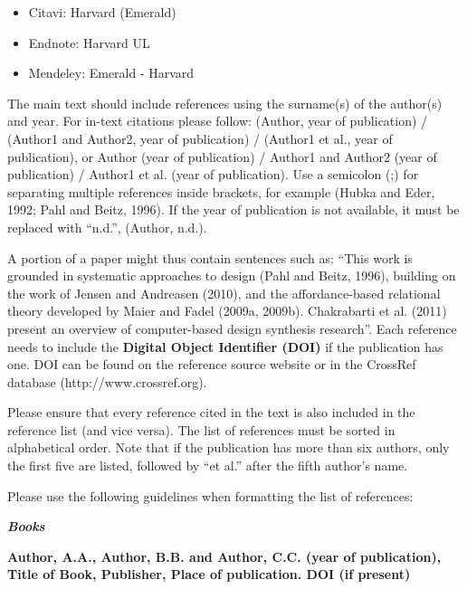 \documentclass{design}
\begin{document}
\begin{itemize}
    \item Citavi: Harvard (Emerald)
    \item Endnote: Harvard UL
    \item Mendeley: Emerald - Harvard
\end{itemize}

The main text should include references using the surname(s) of the author(s) and year. For in-text citations please follow: (Author, year of publication) / (Author1 and Author2, year of publication) / (Author1 et al., year of publication), or Author (year of publication) / Author1 and Author2 (year of publication) / Author1 et al. (year of publication). Use a semicolon (;) for separating multiple references inside brackets, for example (Hubka and Eder, 1992; Pahl and Beitz, 1996). If the year of publication is not available, it must be replaced with “n.d.”, (Author, n.d.).

A portion of a paper might thus contain sentences such as: “This work is grounded in systematic approaches to design (Pahl and Beitz, 1996), building on the work of Jensen and Andreasen (2010), and the affordance-based relational theory developed by Maier and Fadel (2009a, 2009b). Chakrabarti et al. (2011) present an overview of computer-based design synthesis research”.
Each reference needs to include the \textbf{Digital Object Identifier (DOI)} if the publication has one. DOI can be found on the reference source website or in the CrossRef database (http://www.crossref.org). 

Please ensure that every reference cited in the text is also included in the reference list (and vice versa). The list of references must be sorted in alphabetical order. Note that if the publication has more than six authors, only the first five are listed, followed by “et al.” after the fifth author’s name.

Please use the following guidelines when formatting the list of references:

\textbf{\textit{Books}}

\begin{hangparas}{0.63cm}{1}
\textbf{Author, A.A., Author, B.B. and Author, C.C. (year of publication), Title of Book, Publisher, Place of publication. DOI (if present)}

\\[-0.5em]

\end{hangparas}
\end{document}
